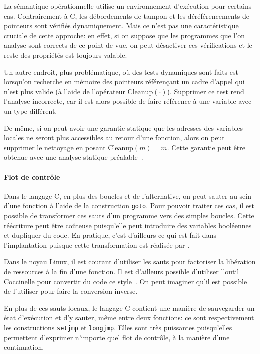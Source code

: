 La sémantique opérationnelle utilise un environnement d'exécution pour certains
cas. Contrairement à C, les débordements de tampon et les déréférencements de
pointeurs sont vérifiés dynamiquement. Mais ce n'est pas une caractéristique
cruciale de cette approche: en effet, si on suppose que les programmes que l'on
analyse sont corrects de ce point de vue, on peut désactiver ces vérifications
et le reste des propriétés est toujours valable.

Un autre endroit, plus problématique, où des tests dynamiques sont faits est
lorsqu'on recherche en mémoire des pointeurs référençant un cadre d'appel qui
n'est plus valide (à l'aide de l'opérateur $\mathrm{Cleanup}(\cdot)$). Supprimer
ce test rend l'analyse incorrecte, car il est alors possible de faire référence
à une variable avec un type différent.

De même, si on peut avoir une garantie statique que les adresses des variables
locales ne seront plus accessibles au retour d'une fonction, alors on peut
supprimer le nettoyage en posant $\mathrm{Cleanup}(m) = m$. Cette garantie peut
être obtenue avec une analyse statique préalable~\cite{ifm10}.

\paragraph{Flot de contrôle}

Dans le langage C, en plus des boucles et de l'alternative, on peut sauter au
sein d'une fonction à l'aide de la construction \texttt{goto}. Pour pouvoir
traiter ces cas, il est possible de transformer ces sauts d'un programme vers
des simples boucles. Cette réécriture peut être coûteuse puisqu'elle peut
introduire des variables booléennes et dupliquer du code. En pratique, c'est
d'ailleurs ce qui est fait dans l'implantation puisque cette transformation est
réalisée par \ctonewspeak.

Dans le noyau Linux, il est courant d'utiliser les sauts pour factoriser la
libération de ressources à la fin d'une fonction. Il est d'ailleurs possible
d'utiliser l'outil Coccinelle pour convertir du code ce style~\cite{lctes11}. On
peut imaginer qu'il est possible de l'utiliser pour faire la conversion inverse.

En plus de ces sauts locaux, le langage C contient une manière de sauvegarder un
état d'exécution et d'y sauter, même entre deux fonctions: ce sont
respectivement les constructions \texttt{setjmp} et \texttt{longjmp}. Elles sont
très puissantes puisqu'elles permettent d'exprimer n'importe quel flot de
contrôle, à la manière d'une continuation.


